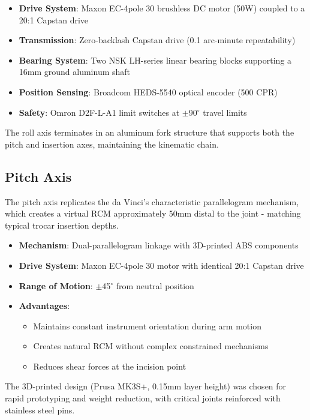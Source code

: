 \begin{itemize}
    \item \textbf{Drive System}: Maxon EC-4pole 30 brushless DC motor (50W) coupled to a 20:1 Capstan drive
    \item \textbf{Transmission}: Zero-backlash Capstan drive (0.1 arc-minute repeatability)
    \item \textbf{Bearing System}: Two NSK LH-series linear bearing blocks supporting a 16mm ground aluminum shaft
    \item \textbf{Position Sensing}: Broadcom HEDS-5540 optical encoder (500 CPR)
    \item \textbf{Safety}: Omron D2F-L-A1 limit switches at $\pm$90$^\circ$ travel limits
\end{itemize}

The roll axis terminates in an aluminum fork structure that supports both the pitch and insertion axes, maintaining the kinematic chain.

\subsection{Pitch Axis}
The pitch axis replicates the da Vinci's characteristic parallelogram mechanism, which creates a virtual RCM approximately 50mm distal to the joint - matching typical trocar insertion depths.

\begin{itemize}
    \item \textbf{Mechanism}: Dual-parallelogram linkage with 3D-printed ABS components
    \item \textbf{Drive System}: Maxon EC-4pole 30 motor with identical 20:1 Capstan drive
    \item \textbf{Range of Motion}: $\pm$45$^\circ$ from neutral position
    \item \textbf{Advantages}:
        \begin{itemize}
            \item Maintains constant instrument orientation during arm motion
            \item Creates natural RCM without complex constrained mechanisms
            \item Reduces shear forces at the incision point
        \end{itemize}
\end{itemize}

The 3D-printed design (Prusa MK3S+, 0.15mm layer height) was chosen for rapid prototyping and weight reduction, with critical joints reinforced with stainless steel pins.

